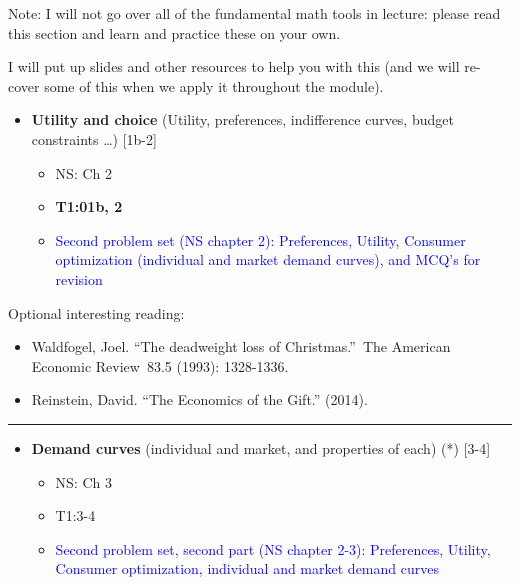 \documentclass[]{article}
\providecommand{\tightlist}{%
  \setlength{\itemsep}{0pt}\setlength{\parskip}{0pt}}
\begin{document}
Note: I will not go over all of the fundamental math tools in lecture: please read this section and learn and practice these on your own.

I will put up slides and other resources to help you with this (and we will re-cover some of this when we apply it throughout the module).

\begin{itemize}
\tightlist
\item
  \textbf{Utility and choice} (Utility, preferences, indifference curves, budget constraints \ldots{}) {[}1b-2{]}

  \begin{itemize}
  \tightlist
  \item
    NS: Ch 2
  \item
    \textbf{T1:01b, 2}
  \item
    \textcolor{blue}{Second problem set (NS chapter 2): Preferences, Utility, Consumer optimization (individual and market demand curves), and MCQ's for revision}
  \end{itemize}
\end{itemize}

Optional interesting reading:

\begin{itemize}
\tightlist
\item
  Waldfogel, Joel. ``The deadweight loss of Christmas.''~The American Economic Review~83.5 (1993): 1328-1336.
\item
  Reinstein, David. ``The Economics of the Gift.'' (2014).
\end{itemize}

\begin{center}\rule{0.5\linewidth}{\linethickness}\end{center}

\begin{itemize}
\tightlist
\item
  \textbf{Demand curves} (individual and market, and properties of each) (*) {[}3-4{]}

  \begin{itemize}
  \item
    NS: Ch 3
  \item
    T1:3-4
  \item
    \textcolor{blue}{Second problem set, second part (NS chapter 2-3): Preferences, Utility, Consumer optimization, individual and market demand curves}
  \end{itemize}
\end{itemize}
\end{document}
